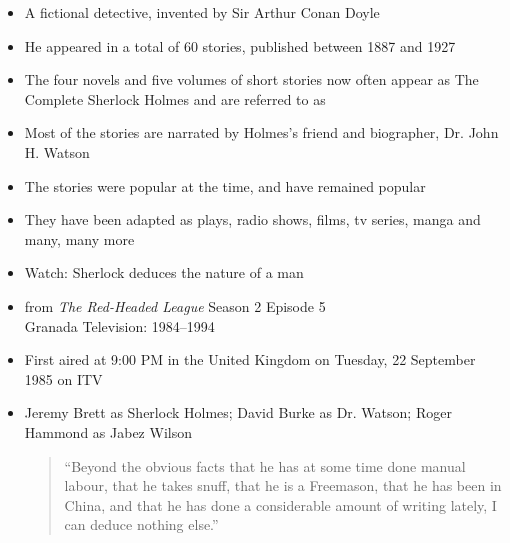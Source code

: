 \documentclass[a4paper,landscape,headrule,footrule,xetex,25pt]{foils}
\begin{document}

\begin{itemize}
\item A fictional detective, invented by Sir Arthur Conan Doyle
\item He appeared in a total of 60 stories,  published between 1887 and 1927
\item The four novels and five volumes of short stories now often
  appear as The Complete Sherlock Holmes and are referred to as 
\item Most of the stories are narrated by Holmes's friend and
  biographer, Dr. John H. Watson
\item The stories were popular at the time, and have remained popular
\item They have been adapted as plays, radio shows, films, tv series, manga and many, many more
\end{itemize}

\begin{itemize}
\item Watch: Sherlock deduces the nature of a man
\item from \textit{The Red-Headed League} Season 2 Episode 5
\\  Granada Television: 1984--1994
\item First aired at 9:00 PM in the United Kingdom on Tuesday, 22 September 1985 on ITV
\item Jeremy Brett as Sherlock Holmes; David Burke as Dr. Watson; Roger Hammond as Jabez Wilson
  \begin{quote}
     “Beyond the obvious facts that he has at some time done manual labour, that he takes snuff, that he is a Freemason, that he has been in China, and that he has done a considerable amount of writing lately, I can deduce nothing else.”
  \end{quote}
\end{itemize}



\end{document}
